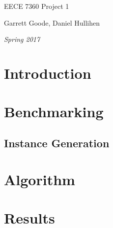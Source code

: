 \documentclass{article}
\begin{document}
\centerline{\sc \large EECE 7360 Project 1}
\vspace{.5pc}
\centerline{\sc Garrett Goode, Daniel Hullihen}
\centerline{\it Spring 2017}

\vspace{2pc}

\section{Introduction}

\section{Benchmarking}

\subsection{Instance Generation}

\section{Algorithm}

\section{Results}

\nocite {schnorr94}
\nocite {lamacchia91}
\nocite {wan2015}
\nocite {kreher1988}
\nocite {lagarias1985}



\end{document}
